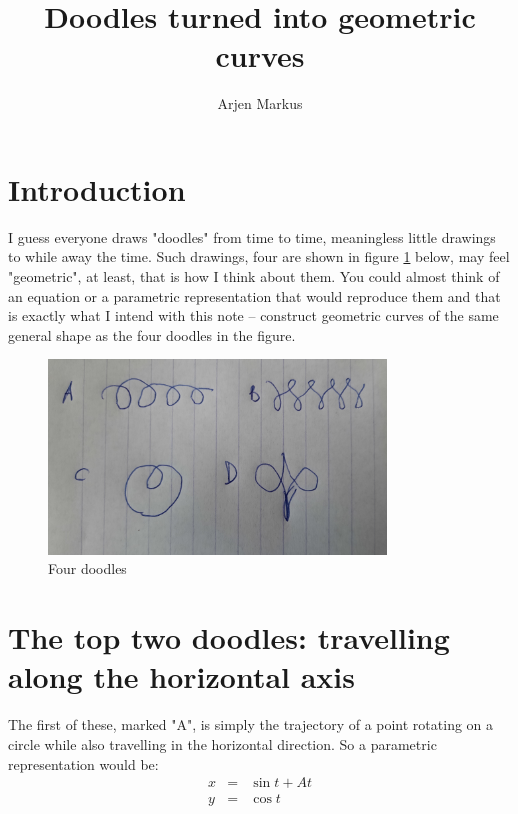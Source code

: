 \documentclass[onecolumn]{article}
\begin{document}
\title{Doodles turned into geometric curves}

\author{Arjen Markus}

\maketitle

\section*{Introduction}
I guess everyone draws "doodles" from time to time, meaningless little drawings to while away the time. Such drawings, four are shown in
figure \ref{doodles} below, may feel "geometric", at least, that is how I think about them. You could almost think of an equation or a
parametric representation that would reproduce them and that is exactly what I intend with this note -- construct geometric curves of the
same general shape as the four doodles in the figure.

\begin{figure}[H]
\caption{Four doodles}
\label{doodles}
\begin{center}
\includegraphics[width=0.8\textwidth]{doodles.jpg}
\end{center}
\end{figure}

\section*{The top two doodles: travelling along the horizontal axis}
The first of these, marked "A", is simply the trajectory of a point rotating on a circle while also travelling in the horizontal direction.
So a parametric representation would be:
\begin{eqnarray}
\nonumber x &=& \sin t + At \\
\nonumber y &=& \cos t
\end{eqnarray}
\end{document}
